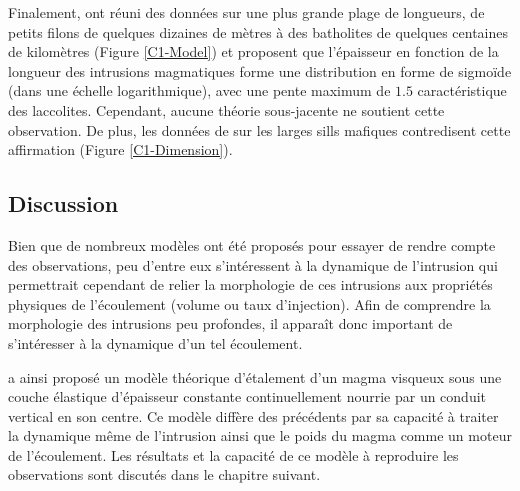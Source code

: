 Finalement, \citet{Nachwuchskoechin:2002tv} ont réuni des données sur
une plus grande plage de longueurs, de petits filons de quelques
dizaines de mètres à des batholites de quelques centaines de
kilomètres (Figure \ref{C1-Model}) et proposent que l'épaisseur en
fonction de la longueur des intrusions magmatiques forme une
distribution en forme de sigmoïde (dans une échelle logarithmique),
avec une pente maximum de $1.5$ caractéristique des laccolites.
Cependant, aucune théorie sous-jacente ne soutient cette observation.
De plus, les données de \citet{Cruden:tg} sur les larges sills
mafiques contredisent cette affirmation (Figure \ref{C1-Dimension}).

\subsection{Discussion}
\label{C1-sec:conclusion}

Bien que de nombreux modèles ont été proposés pour essayer de rendre
compte des observations, peu d'entre eux s'intéressent à la dynamique
de l'intrusion qui permettrait cependant de relier la morphologie de
ces intrusions aux propriétés physiques de l'écoulement (volume ou
taux d'injection). Afin de comprendre la morphologie des intrusions
peu profondes, il apparaît donc important de s'intéresser à la
dynamique d'un tel écoulement.

\citet{Michaut:2011kg} a ainsi proposé un modèle théorique d'étalement
d'un magma visqueux sous une couche élastique d'épaisseur constante
continuellement nourrie par un conduit vertical en son centre. Ce
modèle diffère des précédents par sa capacité à traiter la dynamique
même de l'intrusion ainsi que le poids du magma comme un moteur de
l'écoulement. Les résultats et la capacité de ce modèle à reproduire
les observations sont discutés dans le chapitre suivant.

